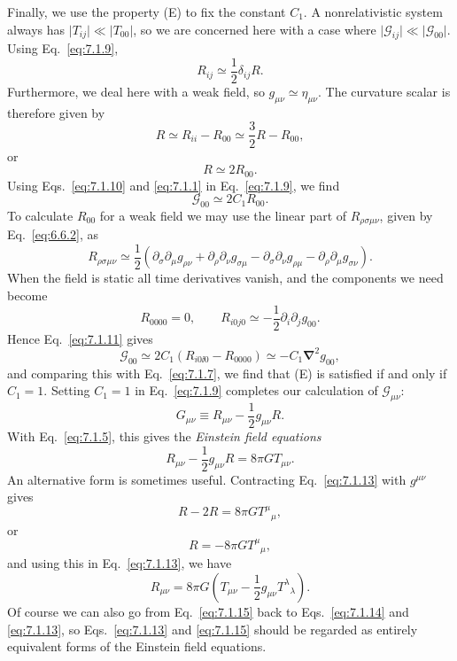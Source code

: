 Finally, we use the property (E) to fix the constant \(C_1\). A
nonrelativistic system always has \(\lvert T_{ij}\rvert\ll\lvert
T_{00}\rvert\), so we are concerned here with a case where
\(\lvert\mathcal G_{ij}\rvert\ll\lvert\mathcal G_{00}\rvert\). Using
Eq.~\eqref{eq:7.1.9},
\[
  R_{ij}\simeq\frac12\delta_{ij}R.
\]
Furthermore, we deal here with a weak field, so
\(g_{\mu\nu}\simeq\eta_{\mu\nu}\). The curvature scalar is therefore given
by
\[
  R\simeq R_{ii}-R_{00}\simeq\frac32R-R_{00},
\]
or
\begin{equation}
  R\simeq2R_{00}.
  \tag{7.1.10}\label{eq:7.1.10}
\end{equation}
Using Eqs.~\eqref{eq:7.1.10} and \eqref{eq:7.1.1} in
Eq.~\eqref{eq:7.1.9}, we find
\begin{equation}
  \mathcal G_{00}\simeq2C_1R_{00}.
  \tag{7.1.11}\label{eq:7.1.11}
\end{equation}
To calculate \(R_{00}\) for a weak field we may use the linear part of
\(R_{\rho\sigma\mu\nu}\), given by Eq.~\eqref{eq:6.6.2}, as
\[
  R_{\rho\sigma\mu\nu}
  \simeq
  \frac12\left(
    \partial_\sigma\partial_\mu g_{\rho\nu}
    +\partial_\rho\partial_\nu g_{\sigma\mu}
    -\partial_\sigma\partial_\nu g_{\rho\mu}
    -\partial_\rho\partial_\mu g_{\sigma\nu}
  \right).
\]
When the field is static all time derivatives vanish, and the components we
need become
\[
  R_{0000}=0,
  \qquad
  R_{i0j0}\simeq-\frac12\partial_i\partial_jg_{00}.
\]
Hence Eq.~\eqref{eq:7.1.11} gives
\[
  \mathcal G_{00}
  \simeq2C_1(R_{i0\ii0}-R_{0000})
  \simeq-C_1\boldsymbol{\nabla}^{2}g_{00},
\]
and comparing this with Eq.~\eqref{eq:7.1.7}, we find that (E) is satisfied
if and only if \(C_1=1\). Setting \(C_1=1\) in Eq.~\eqref{eq:7.1.9}
completes our calculation of \(\mathcal G_{\mu\nu}\):
\begin{equation}
  G_{\mu\nu}
  \equiv
  R_{\mu\nu}-\frac12g_{\mu\nu}R.
  \tag{7.1.12}\label{eq:7.1.12}
\end{equation}
With Eq.~\eqref{eq:7.1.5}, this gives the \emph{Einstein field equations}
\begin{equation}
  R_{\mu\nu}-\frac12g_{\mu\nu}R
  =
  8\pi G T_{\mu\nu}.
  \tag{7.1.13}\label{eq:7.1.13}
\end{equation}
An alternative form is sometimes useful. Contracting
Eq.~\eqref{eq:7.1.13} with \(g^{\mu\nu}\) gives
\[
  R-2R=8\pi G T^\mu{}_\mu,
\]
or
\begin{equation}
  R=-8\pi G T^\mu{}_\mu,
  \tag{7.1.14}\label{eq:7.1.14}
\end{equation}
and using this in Eq.~\eqref{eq:7.1.13}, we have
\begin{equation}
  R_{\mu\nu}
  =
  8\pi G\left(
    T_{\mu\nu}-\frac12g_{\mu\nu}T^\lambda{}_\lambda
  \right).
  \tag{7.1.15}\label{eq:7.1.15}
\end{equation}
Of course we can also go from Eq.~\eqref{eq:7.1.15} back to
Eqs.~\eqref{eq:7.1.14} and \eqref{eq:7.1.13}, so
Eqs.~\eqref{eq:7.1.13} and \eqref{eq:7.1.15} should be regarded as entirely
equivalent forms of the Einstein field equations.

